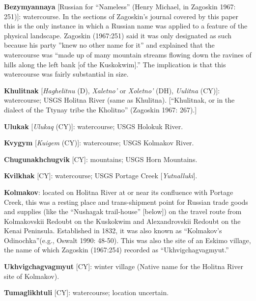 \begin{hang}

\textbf{Bezymyannaya} [Russian for “Nameless” (Henry Michael, in Zagoskin 1967: 251)]: watercourse. In the sections of Zagoskin’s journal covered by this paper this is the only instance in which a Russian name was applied to a feature of the physical landscape. Zagoskin (1967:251) said it was only designated as such because his party ”knew no other name for it” and explained that the watercourse was “made up of many mountain streams flowing down the ravines of hills along the left bank [of the Kuskokwim].” The implication is that this watercourse was fairly substantial in size.



\textbf{Khulitnak} [\textit{Haghelitnu} (D), \textit{Xaletno’} or \textit{Xoletno’} (DH), \textit{Uulitna} (CY)]: watercourse; USGS Holitna River (same as Khulitna). [“Khulitnak, or in the dialect of the Ttynay tribe the Kholitno” (Zagoskin 1967: 267).]



\textbf{Ulukak} [\textit{Ulukaq} (CY)]: watercourse; USGS Holokuk River.



\textbf{Kvygym} [\textit{Kuigem} (CY)]: watercourse; USGS Kolmakov River.



\textbf{Chugunakhchugvik} [CY]: mountains; USGS Horn Mountains.



\textbf{Kvilkhak} [CY]: watercourse; USGS Portage Creek [\textit{Yutnalluki}].



\textbf{Kolmakov}: located on Holitna River at or near its confluence with Portage Creek, this was a resting place and trans-shipment point for Russian trade goods and supplies (like the “Nushagak trail-house” [below]) on the travel route from Kolmakovskii Redoubt on the Kuskokwim and Alexandrovskii Redoubt on the Kenai Peninsula. Established in 1832, it was also known as “Kolmakov’s Odinochka”(e.g., Oswalt 1990: 48-50). This was also the site of an Eskimo village, the name of which Zagoskin (1967:254) recorded as “Ukhvigchagvagmyut.”



\textbf{Ukhvigchagvagmyut} [CY]: winter village (Native name for the Holitna River site of Kolmakov).



\textbf{Tumaglikhtuli} [CY]: watercourse; location uncertain.




\end{hang}
